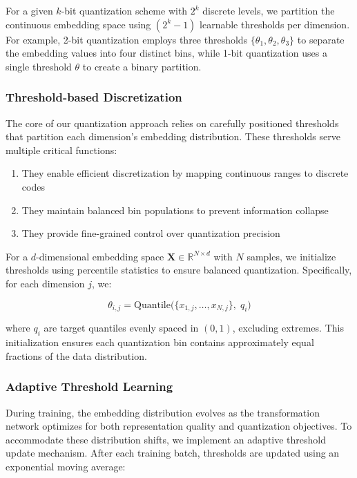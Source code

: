 For a given $k$-bit quantization scheme with $2^k$ discrete levels, we partition the continuous embedding space using $(2^k - 1)$ learnable thresholds per dimension. For example, 2-bit quantization employs three thresholds $\{\theta_1, \theta_2, \theta_3\}$ to separate the embedding values into four distinct bins, while 1-bit quantization uses a single threshold $\theta$ to create a binary partition.

\subsubsection{Threshold-based Discretization}
The core of our quantization approach relies on carefully positioned thresholds that partition each dimension's embedding distribution. These thresholds serve multiple critical functions:

\begin{enumerate}
    \item They enable efficient discretization by mapping continuous ranges to discrete codes
    \item They maintain balanced bin populations to prevent information collapse
    \item They provide fine-grained control over quantization precision
\end{enumerate}

For a $d$-dimensional embedding space $\mathbf{X} \in \mathbb{R}^{N \times d}$ with $N$ samples, we initialize thresholds using percentile statistics to ensure balanced quantization. Specifically, for each dimension $j$, we:

\begin{equation}
    \theta_{i,j} = \text{Quantile}\bigl(\{x_{1,j}, \ldots, x_{N,j}\},\; q_i\bigr)
\end{equation}

where $q_i$ are target quantiles evenly spaced in $(0,1)$, excluding extremes. This initialization ensures each quantization bin contains approximately equal fractions of the data distribution.

\subsubsection{Adaptive Threshold Learning}
During training, the embedding distribution evolves as the transformation network optimizes for both representation quality and quantization objectives. To accommodate these distribution shifts, we implement an adaptive threshold update mechanism. After each training batch, thresholds are updated using an exponential moving average:

